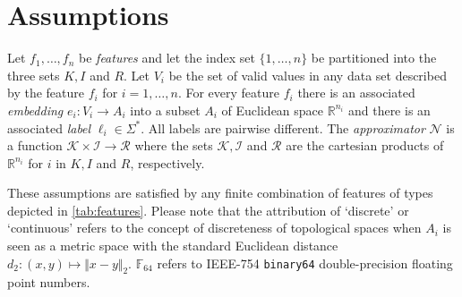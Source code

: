 \documentclass[a4paper,parskip=half]{article} %
\author{Franz Brauße  \and
	Zurab Khasidashvili \and
	Konstantin Korovin}
\begin{document}
\section{Assumptions}
Let $f_1,\ldots,f_n$ be \emph{features} and let
the index set $\{1,\ldots,n\}$ be partitioned into the three sets $K,I$ and $R$.
Let $V_i%
$ be the set of valid values
in any data set described by the feature $f_i$ for $i=1,\ldots,n$.
For every feature $f_i$ there is an associated \emph{embedding} $e_i:V_i\to A_i$
into a subset $A_i$ of Euclidean space $\mathbb R^{n_i}$ and
there is an associated \emph{label} $\ell_i\in\Sigma^*$.
All labels are pairwise different.
The \emph{approximator} $\mathcal N$ is a function
$\mathcal K\times\mathcal I\to\mathcal R$ where
the sets $\mathcal K,\mathcal I$ and $\mathcal R$ are the cartesian products of
$\mathbb R^{n_i}$ for $i$ in $K,I$ and $R$, respectively.

These assumptions are satisfied by any finite combination of features of types
depicted in \cref{tab:features}.
Please note that the attribution of `discrete' or `continuous' refers to the
concept of discreteness of topological spaces when $A_i$ is seen as a metric
space with the standard Euclidean distance $d_2:(x,y)\mapsto\Vert x-y\Vert_2$.
$\mathbb F_{64}$ refers to IEEE-754 \texttt{binary64} double-precision
floating point numbers.
\end{document}
